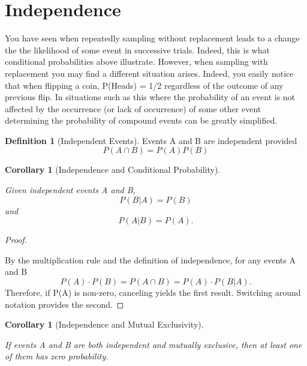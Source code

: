 \documentclass[10pt,]{book}
\theoremstyle{plain}
\newtheorem{corollary}[theorem]{Corollary}
\theoremstyle{definition}
\newtheorem{definition}[theorem]{Definition}
\theoremstyle{definition}
\theoremstyle{definition}
\numberwithin{equation}{section}
\begin{document}
\section[{Independence}]{Independence}\label{section-21}
\typeout{************************************************}
\typeout{************************************************}

		You have seen when repeatedly sampling without replacement leads to a change the the likelihood of some event in successive trials. Indeed, this is what conditional probabilities above illustrate. However, when sampling with replacement you may find a different situation arises. Indeed, you easily notice that when flipping a coin, P(Heads) = 1/2 regardless of the outcome of any previous flip.  In situations such as this where the probability of an event is not affected by the occurrence (or lack of occurrence) of some other event determining the probability of compound events can be greatly simplified.
\begin{definition}[{Independent Events}]\label{definition-24}
Events A and B are independent provided 
		\begin{equation*}P(A \cap B) = P(A) P(B)\end{equation*}\end{definition}
\begin{corollary}[{Independence and Conditional Probability}]\label{corollary-3}

			Given independent events A and B, 
			\begin{equation*}P(B | A) = P(B)\end{equation*} and \begin{equation*}P(A | B) = P(A).\end{equation*}\end{corollary}
\begin{proof}\hypertarget{proof-21}{}
By the multiplication rule and the definition of independence, for any events A and B
			\begin{equation*}P(A) \cdot P(B) = P(A \cap B) = P(A) \cdot P(B | A) .\end{equation*}
			Therefore, if P(A) is non-zero, canceling yields the first result. Switching around notation provides the second.
\end{proof}
\begin{corollary}[{Independence and Mutual Exclusivity}]\label{corollary-4}

			If events A and B are both independent and mutually exclusive, then at least one of them has zero probability.
		\end{corollary}
\end{document}
